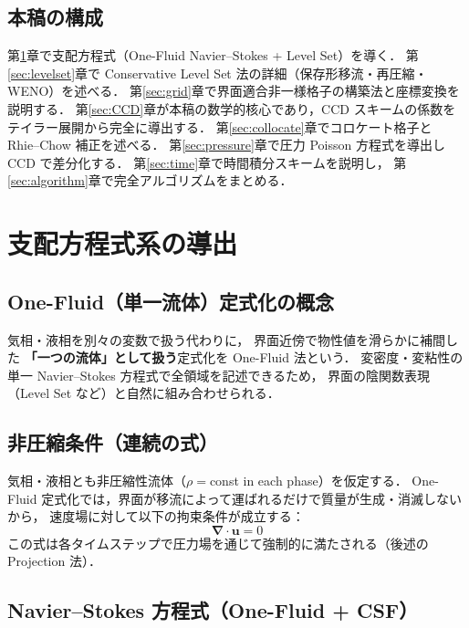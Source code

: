 \documentclass[12pt, a4paper, titlepage, xelatex, ja=standard]{bxjsarticle}
\newcommand{\bu}{\bm{u}}
\newcommand{\bnabla}{\bm{\nabla}}
\begin{document}
\subsection{本稿の構成}

第\ref{sec:governing}章で支配方程式（One-Fluid Navier--Stokes + Level Set）を導く．
第\ref{sec:levelset}章で Conservative Level Set 法の詳細（保存形移流・再圧縮・WENO）を述べる．
第\ref{sec:grid}章で界面適合非一様格子の構築法と座標変換を説明する．
第\ref{sec:CCD}章が本稿の数学的核心であり，CCD スキームの係数をテイラー展開から完全に導出する．
第\ref{sec:collocate}章でコロケート格子と Rhie--Chow 補正を述べる．
第\ref{sec:pressure}章で圧力 Poisson 方程式を導出し CCD で差分化する．
第\ref{sec:time}章で時間積分スキームを説明し，
第\ref{sec:algorithm}章で完全アルゴリズムをまとめる．


\section{支配方程式系の導出}
\label{sec:governing}

\subsection{One-Fluid（単一流体）定式化の概念}

気相・液相を別々の変数で扱う代わりに，
界面近傍で物性値を滑らかに補間した \textbf{「一つの流体」として扱う}定式化を One-Fluid 法という．
変密度・変粘性の単一 Navier--Stokes 方程式で全領域を記述できるため，
界面の陰関数表現（Level Set など）と自然に組み合わせられる．

\subsection{非圧縮条件（連続の式）}

気相・液相とも非圧縮性流体（$\rho = $const in each phase）を仮定する．
One-Fluid 定式化では，界面が移流によって運ばれるだけで質量が生成・消滅しないから，
速度場に対して以下の拘束条件が成立する：
\begin{equation}
  \bnabla \cdot \bu = 0
  \label{eq:continuity}
\end{equation}
この式は各タイムステップで圧力場を通じて強制的に満たされる（後述の Projection 法）．

\subsection{Navier--Stokes 方程式（One-Fluid + CSF）}
\end{document}
